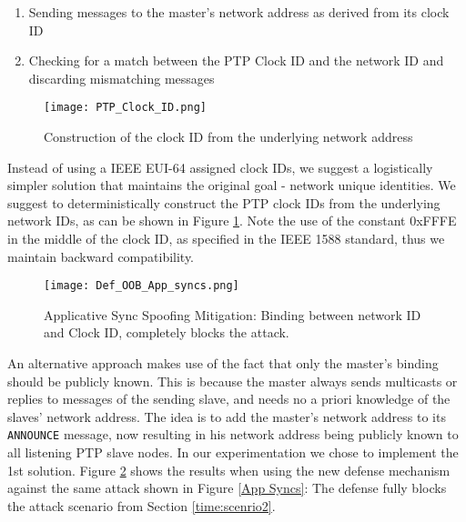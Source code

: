 \documentclass[11pt]{article}
\begin{document}
\begin{enumerate}

  \item Sending messages to the master's network address as derived from its clock ID

  \item Checking for a match between the PTP Clock ID and the network ID and discarding mismatching messages

\end{enumerate}



\begin{figure}[t]

\centerline{\texttt{[image: PTP\_Clock\_ID.png]}}

\caption{Construction of the clock ID from the underlying network address}

\label{clock ID}

\end{figure}



Instead of using a IEEE EUI-64 assigned clock IDs, we suggest a logistically simpler solution that maintains the original goal - network unique identities. We suggest to deterministically construct the PTP clock IDs from the underlying network IDs, as can be shown in Figure \ref{clock ID}. Note the use of the constant 0xFFFE in the middle of the clock ID, as specified in the IEEE 1588 standard, thus we maintain backward compatibility.



\begin{figure}[t]

\centerline{\texttt{[image: Def\_OOB\_App\_syncs.png]}}

\caption{Applicative Sync Spoofing Mitigation: Binding between network ID and Clock ID, completely blocks the attack.}

\label{2nd Mitigation}

\end{figure}



An alternative approach makes use of the fact that only the master's binding should be publicly known. This is because the master always sends multicasts or replies to messages of the sending slave, and needs no a priori knowledge of the slaves' network address. The idea is to add the master's network address to its \texttt{ANNOUNCE} message, now resulting in his network address being publicly known to all listening PTP slave nodes. In our experimentation we chose to implement the 1st solution. Figure \ref{2nd Mitigation} shows the results when using the new defense mechanism against the same attack shown in Figure \ref{App Syncs}: The defense fully blocks the attack scenario from Section \ref{time:scenrio2}.
\end{document}
